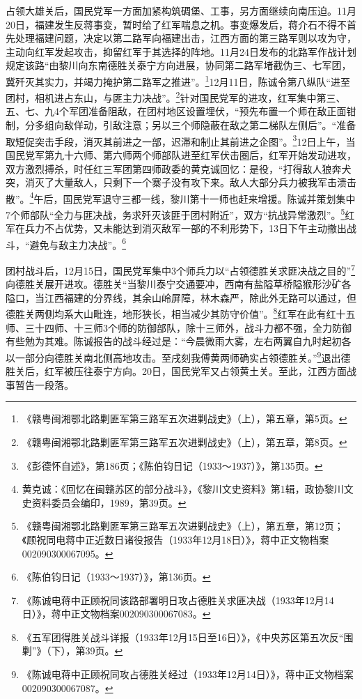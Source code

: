 占领大雄关后，国民党军一方面加紧构筑碉堡、工事，另方面继续向南压迫。11月20日，福建发生反蒋事变，暂时给了红军喘息之机。事变爆发后，蒋介石不得不首先处理福建问题，决定以第二路军向福建出击，江西方面的第三路军则以攻为守，主动向红军发起攻击，抑留红军于其选择的阵地。11月24日发布的北路军作战计划规定该路“由黎川向东南德胜关泰宁方向进展，协同第二路军堵截伪三、七军团，冀歼灭其实力，并竭力掩护第二路军之推进”。\footnote{《赣粤闽湘鄂北路剿匪军第三路军五次进剿战史》（上），第五章，第5页。}12月11日，陈诚令第八纵队“进至团村，相机进占东山，与匪主力决战”。\footnote{《赣粤闽湘鄂北路剿匪军第三路军五次进剿战史》（上），第五章，第8页。}针对国民党军的进攻，红军集中第三、五、七、九4个军团准备阻敌，在团村地区设置埋伏，“预先布置一个师在敌正面钳制，分多组向敌佯动，引敌注意；另以三个师隐蔽在敌之第二梯队左侧后”。“准备取短促突击手段，消灭其前进之一部，迟滞和制止其前进之企图”。\footnote{《彭德怀自述》，第186页；《陈伯钧日记（1933～1937）》，第135页。}12日上午，当国民党军第九十六师、第六师两个师部队进至红军伏击圈后，红军开始发动进攻，双方激烈搏杀，时任红三军团第四师政委的黄克诚回忆：是役，“打得敌人狼奔犬突，消灭了大量敌人，只剩下一个寨子没有攻下来。敌人大部分兵力被我军击溃击散”。\footnote{黄克诚：《回忆在闽赣苏区的部分战斗》，《黎川文史资料》第1辑，政协黎川文史资料委员会编印，1989，第39页。}午后，国民党军退守三都一线，黎川第十一师也赶来增援。陈诚并策划集中7个师部队“全力与匪决战，务求歼灭该匪于团村附近”，双方“抗战异常激烈”。\footnote{《赣粤闽湘鄂北路剿匪军第三路军五次进剿战史》（上），第五章，第12页；《顾祝同电蒋中正近数日诸役报告（1933年12月18日）》，蒋中正文物档案002090300067095。}红军在兵力不占优势，又未能达到消灭敌军一部的不利形势下，13日下午主动撤出战斗，“避免与敌主力决战”。\footnote{《陈伯钧日记（1933～1937）》，第136页。}


团村战斗后，12月15日，国民党军集中3个师兵力以“占领德胜关求匪决战之目的”\footnote{《陈诚电蒋中正顾祝同该路部署明日攻占德胜关求匪决战（1933年12月14日）》，蒋中正文物档案002090300067083。}向德胜关展开进攻。德胜关“当黎川泰宁交通要冲，西南有盐隘草桥隘猴形沙矿各隘口，当江西福建的分界线，其余山岭屏障，林木森严，除此外无路可以通过，但德胜关两侧均系大山毗连，地形狭长，相当减少其防守价值”。\footnote{《五军团得胜关战斗详报（1933年12月15日至16日）》，《中央苏区第五次反“围剿”》（下），第39页。}红军在此有红十五师、三十四师、十三师3个师的防御部队，除十三师外，战斗力都不强，全力防御有些勉为其难。陈诚报告的战斗经过是：“今晨微雨大雾，左右两翼自九时起初各以一部分向德胜关南北侧高地攻击。至戌刻我傅黄两师确实占领德胜关。”\footnote{《陈诚电蒋中正顾祝同攻占德胜关经过（1933年12月14日）》，蒋中正文物档案002090300067087。}退出德胜关后，红军被压往泰宁方向。20日，国民党军又占领黄土关。至此，江西方面战事暂告一段落。


